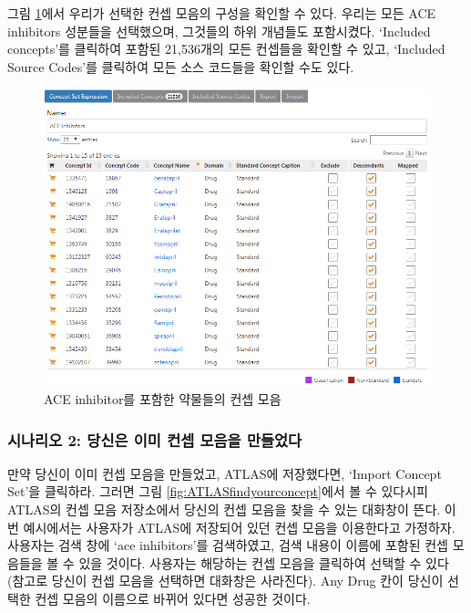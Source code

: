 \documentclass[11pt]{book}
\theoremstyle{definition}
\theoremstyle{definition}
\theoremstyle{definition}
\theoremstyle{remark}
\begin{document}
그림 \ref{fig:aceConceptSetExpression}에서 우리가 선택한 컨셉 모음의
구성을 확인할 수 있다. 우리는 모든 ACE inhibitors 성분들을 선택했으며,
그것들의 하위 개념들도 포함시켰다. `Included concepts'를 클릭하여 포함된
21,536개의 모든 컨셉들을 확인할 수 있고, `Included Source Codes'를
클릭하여 모든 소스 코드들을 확인할 수도 있다.

\begin{figure}

{\centering \includegraphics[width=1\linewidth]{images/Cohorts/aceConceptSetExpression} 

}

\caption{ACE inhibitor를 포함한 약물들의 컨셉 모음}\label{fig:aceConceptSetExpression}
\end{figure}

\subsubsection*{시나리오 2: 당신은 이미 컨셉 모음을
만들었다}\label{-2-----}

만약 당신이 이미 컨셉 모음을 만들었고, ATLAS에 저장했다면, `Import
Concept Set'을 클릭하라. 그러면 그림 \ref{fig:ATLASfindyourconcept}에서
볼 수 있다시피 ATLAS의 컨셉 모음 저장소에서 당신의 컨셉 모음을 찾을 수
있는 대화창이 뜬다. 이번 예시에서는 사용자가 ATLAS에 저장되어 있던 컨셉
모음을 이용한다고 가정하자. 사용자는 검색 창에 `ace inhibitors'를
검색하였고, 검색 내용이 이름에 포함된 컨셉 모음들을 볼 수 있을 것이다.
사용자는 해당하는 컨셉 모음을 클릭하여 선택할 수 있다 (참고로 당신이
컨셉 모음을 선택하면 대화창은 사라진다). Any Drug 칸이 당신이 선택한
컨셉 모음의 이름으로 바뀌어 있다면 성공한 것이다.
\end{document}
